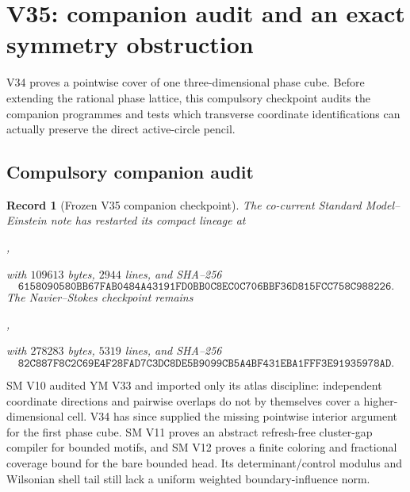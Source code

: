 \documentclass[11pt,oneside]{article}
\newtheorem{record}[theorem]{Record}
\theoremstyle{definition}
\theoremstyle{remark}
\begin{document}
\section{V35: companion audit and an exact symmetry obstruction}
\label{sec:newv35-audit-symmetry}

V34 proves a pointwise cover of one three-dimensional phase cube.
Before extending the rational phase lattice, this compulsory
checkpoint audits the companion programmes and tests which
transverse coordinate identifications can actually preserve the
direct active-circle pencil.

\subsection{Compulsory companion audit}

\begin{record}[Frozen V35 companion checkpoint]
\label{rec:newv35-companions}
The co-current Standard Model--Einstein note has restarted its
compact lineage at
\begin{center}
,
\end{center}
with \(109613\) bytes, \(2944\) lines, and SHA--256
\[
\texttt{6158090580BB67FAB0484A43191FD0BB0C8EC0C706BBF36D815FCC758C988226}.
                                                               \tag{35.1}
\]
The Navier--Stokes checkpoint remains
\begin{center}
,
\end{center}
with \(278283\) bytes, \(5319\) lines, and SHA--256
\[
\texttt{82C887F8C2C69E4F28FAD7C3DC8DE5B9099CB5A4BF431EBA1FFF3E91935978AD}.
                                                               \tag{35.2}
\]
\end{record}

SM V10 audited YM V33 and imported only its atlas discipline:
independent coordinate directions and pairwise overlaps do not by
themselves cover a higher-dimensional cell.  V34 has since supplied
the missing pointwise interior argument for the first phase cube.
SM V11 proves an abstract refresh-free cluster-gap compiler for
bounded motifs, and SM V12 proves a finite coloring and fractional
coverage bound for the bare bounded head.  Its determinant/control
modulus and Wilsonian shell tail still lack a uniform weighted
boundary-influence norm.
\end{document}
